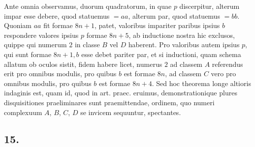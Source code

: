 \documentclass[twoside,12pt]{memoir}
\begin{document}
Ante omnia observamus, duorum quadratorum, in quae \(p\) discerpitur, alterum impar esse debere, quod statuemus \(=a a\), alterum par, quod statuemus \(=b b\). Quoniam \(a {a}\) fit formae \(8 n+1\), patet, valoribus impariter paribus ipsius \(b\) respondere valores ipsius \(p\) formae \(8 n+5\), ab inductione nostra hic exclusos, quippe qui numerum \(2\) in classe \(B\) vel \(D\) haberent. Pro valoribus autem ipsius \(p\), qui sunt formae \(8 n+1, b\) esse debet pariter par, et si inductioni, quam schema allatum ob oculos sistit, fidem habere licet, numerus \(2\) ad classem \(A\) referendus erit pro omnibus modulis, pro quibus \(b\) est formae \(8 n\), ad classem \(C\) vero pro omnibus modulis, pro quibus \(b\) est formae \(8 n+4\). Sed hoc theorema longe altioris indaginis est, quam id, quod in art. praec. eruimus, demonstrationique plures disquisitiones praeliminares sunt praemittendae, ordinem, quo numeri complexuum \(A\), \(B\), \(C\), \(D\) se invicem sequuntur, spectantes.

\subsection*{15.}
 
\end{document}
